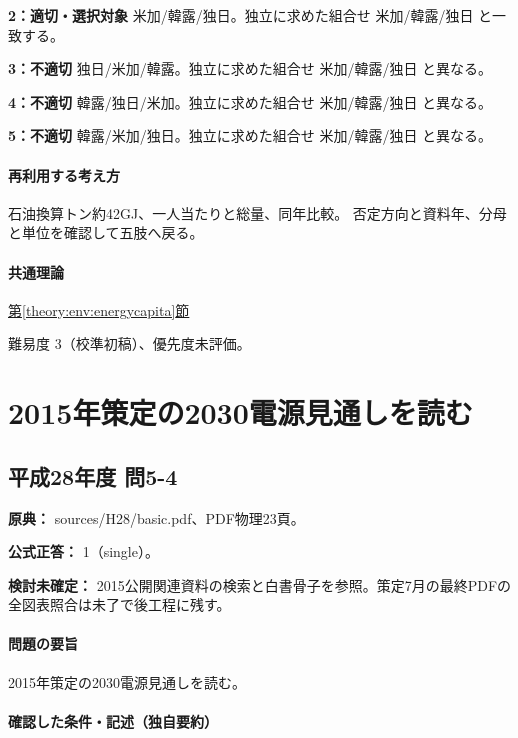 \noindent\textbf{2：適切・選択対象} 米加/韓露/独日。独立に求めた組合せ 米加/韓露/独日 と一致する。\par

\noindent\textbf{3：不適切} 独日/米加/韓露。独立に求めた組合せ 米加/韓露/独日 と異なる。\par

\noindent\textbf{4：不適切} 韓露/独日/米加。独立に求めた組合せ 米加/韓露/独日 と異なる。\par

\noindent\textbf{5：不適切} 韓露/米加/独日。独立に求めた組合せ 米加/韓露/独日 と異なる。\par

\paragraph{再利用する考え方} 石油換算トン約42GJ、一人当たりと総量、同年比較。 否定方向と資料年、分母と単位を確認して五肢へ戻る。

\paragraph{共通理論} \hyperref[theory:env:energycapita]{第\ref*{theory:env:energycapita}節}

\par 難易度 3（校準初稿）、優先度未評価。

\section{2015年策定の2030電源見通しを読む}

\subsection{平成28年度 問5-4}
\label{q:h28-reg-basic-5-4}

\noindent\textbf{原典：} sources/H28/basic.pdf、PDF物理23頁。

\textbf{公式正答：} 1（single）。

\par\textbf{検討未確定：} 2015公開関連資料の検索と白書骨子を参照。策定7月の最終PDFの全図表照合は未了で後工程に残す。

\paragraph{問題の要旨} 2015年策定の2030電源見通しを読む。

\paragraph{確認した条件・記述（独自要約）}\mbox{}\par

